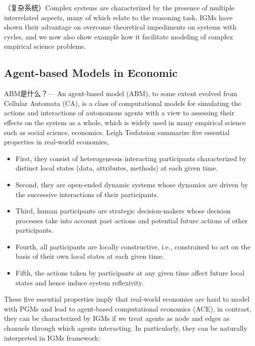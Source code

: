 \documentclass{article}
\theoremstyle{definition}
\theoremstyle{remark}
\theoremstyle{definition}
\begin{document}
\begin{CJK*}{UTF8}{gbsn}
（复杂系统）Complex systems are characterized by the presence of multiple interrelated aspects, many of which relate to the reasoning task. 
IGMs have shown their advantage on overcome theoretical impediments on systems with cycles, and we now also show example how it facilitate modeling of complex empirical science problems.

\subsection{Agent-based Models in Economic}

ABM是什么？---
An agent-based model (ABM), to some extent evolved from Cellular Automata (CA), is a class of computational models for simulating the actions and interactions of autonomous agents with a view to assessing their effects on the system as a whole, which is widely used in many empirical science such as social science, economics. Leigh Tesfatsion summarize five essential properties in real-world economies, 

\begin{itemize}
    \item  First, they consist of heterogeneous interacting participants characterized by distinct local states (data, attributes, methods) at each given time. 
    \item Second, they are open-ended dynamic systems whose dynamics are driven by the successive interactions of their participants. 
    \item Third, human participants are strategic decision-makers whose decision processes take into account past actions and potential future actions of other participants. 
    \item Fourth, all participants are locally constructive, i.e., constrained to act on the basis of their own local states at each given time. 
    \item Fifth, the actions taken by participants at any given time affect future local states and hence induce system reflexivity.
\end{itemize}

These five essential properties imply that real-world economies are hard to model with PGMs and lead to agent-based computational economics (ACE)\cite{tesfatsion2006handbook, tesfatsion2002agent}, in contrast, they can be characterized by IGMs if we treat agents as node and edges as channels through which agents interacting. In particularly, they can be naturally interpreted in IGMs framework:


\end{CJK*}
\end{document}
